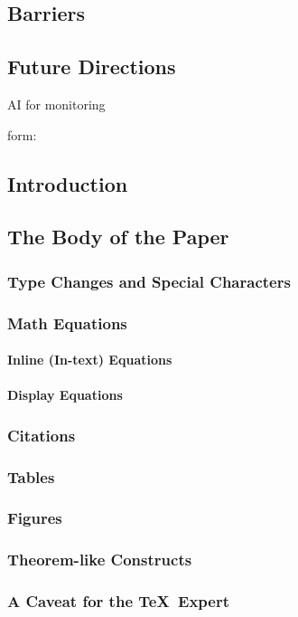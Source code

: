 \documentclass[sigconf]{acmart}
\begin{document}
\subsection{Barriers}

\subsection{Future Directions}
AI for monitoring

\appendix

form:

\subsection{Introduction}
\subsection{The Body of the Paper}
\subsubsection{Type Changes and  Special Characters}
\subsubsection{Math Equations}
\paragraph{Inline (In-text) Equations}
\paragraph{Display Equations}
\subsubsection{Citations}
\subsubsection{Tables}
\subsubsection{Figures}
\subsubsection{Theorem-like Constructs}
\subsubsection*{A Caveat for the \TeX\ Expert}
\end{document}
